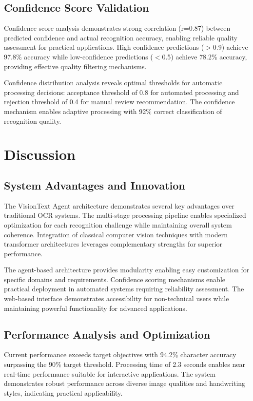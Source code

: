 \documentclass[10pt,twocolumn]{article}
\begin{document}
\subsection{Confidence Score Validation}

Confidence score analysis demonstrates strong correlation (r=0.87) between predicted confidence and actual recognition accuracy, enabling reliable quality assessment for practical applications. High-confidence predictions ($>$0.9) achieve 97.8\% accuracy while low-confidence predictions ($<$0.5) achieve 78.2\% accuracy, providing effective quality filtering mechanisms.

Confidence distribution analysis reveals optimal thresholds for automatic processing decisions: acceptance threshold of 0.8 for automated processing and rejection threshold of 0.4 for manual review recommendation. The confidence mechanism enables adaptive processing with 92\% correct classification of recognition quality.

\section{\large Discussion}

\subsection{System Advantages and Innovation}

The VisionText Agent architecture demonstrates several key advantages over traditional OCR systems. The multi-stage processing pipeline enables specialized optimization for each recognition challenge while maintaining overall system coherence. Integration of classical computer vision techniques with modern transformer architectures leverages complementary strengths for superior performance.

The agent-based architecture provides modularity enabling easy customization for specific domains and requirements. Confidence scoring mechanisms enable practical deployment in automated systems requiring reliability assessment. The web-based interface demonstrates accessibility for non-technical users while maintaining powerful functionality for advanced applications.

\subsection{Performance Analysis and Optimization}

Current performance exceeds target objectives with 94.2\% character accuracy surpassing the 90\% target threshold. Processing time of 2.3 seconds enables near real-time performance suitable for interactive applications. The system demonstrates robust performance across diverse image qualities and handwriting styles, indicating practical applicability.
\end{document}
